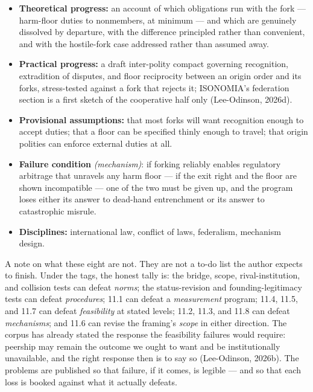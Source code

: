 \documentclass[
  11pt,
  letterpaper,
]{article}
\providecommand{\tightlist}{%
  \setlength{\itemsep}{0pt}\setlength{\parskip}{0pt}}
\begin{document}
\begin{itemize}
\tightlist
\item
  \textbf{Theoretical progress:} an account of which obligations run
  with the fork --- harm-floor duties to nonmembers, at minimum --- and
  which are genuinely dissolved by departure, with the difference
  principled rather than convenient, and with the hostile-fork case
  addressed rather than assumed away.
\item
  \textbf{Practical progress:} a draft inter-polity compact governing
  recognition, extradition of disputes, and floor reciprocity between an
  origin order and its forks, stress-tested against a fork that rejects
  it; ISONOMIA's federation section is a first sketch of the cooperative
  half only (Lee-Odinson, 2026d).
\item
  \textbf{Provisional assumptions:} that most forks will want
  recognition enough to accept duties; that a floor can be specified
  thinly enough to travel; that origin polities can enforce external
  duties at all.
\item
  \textbf{Failure condition} \emph{(mechanism)}: if forking reliably
  enables regulatory arbitrage that unravels any harm floor --- if the
  exit right and the floor are shown incompatible --- one of the two
  must be given up, and the program loses either its answer to dead-hand
  entrenchment or its answer to catastrophic misrule.
\item
  \textbf{Disciplines:} international law, conflict of laws, federalism,
  mechanism design.
\end{itemize}

A note on what these eight are not. They are not a to-do list the author
expects to finish. Under the tags, the honest tally is: the bridge,
scope, rival-institution, and collision tests can defeat \emph{norms};
the status-revision and founding-legitimacy tests can defeat
\emph{procedures}; 11.1 can defeat a \emph{measurement} program; 11.4,
11.5, and 11.7 can defeat \emph{feasibility} at stated levels; 11.2,
11.3, and 11.8 can defeat \emph{mechanisms}; and 11.6 can revise the
framing's \emph{scope} in either direction. The corpus has already
stated the response the feasibility failures would require: peership may
remain the outcome we ought to want and be institutionally unavailable,
and the right response then is to say so (Lee-Odinson, 2026b). The
problems are published so that failure, if it comes, is legible --- and
so that each loss is booked against what it actually defeats.
\end{document}
